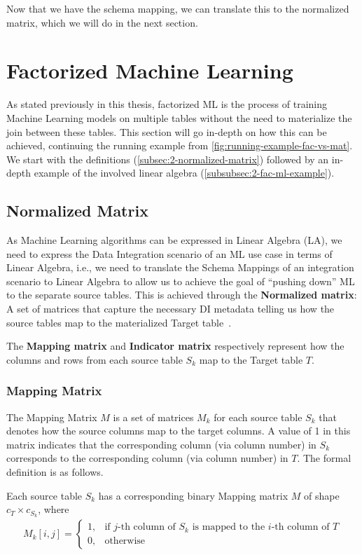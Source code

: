 Now that we have the schema mapping, we can translate this to the normalized matrix, which we will do in the next section.

\section{Factorized Machine Learning}
\label{sec:2-factorized-ml}
As stated previously in this thesis, factorized ML is the process of training Machine Learning models on multiple tables without the need to materialize the join between these tables. This section will go in-depth on how this can be achieved, continuing the running example from \autoref{fig:running-example-fac-vs-mat}.  We start with the definitions (\autoref{subsec:2-normalized-matrix}) followed by an in-depth example of the involved linear algebra (\autoref{subsubsec:2-fac-ml-example}).

\subsection{Normalized Matrix}
\label{subsec:2-normalized-matrix}
As Machine Learning algorithms can be expressed in Linear Algebra (LA), we need to express the Data Integration scenario of an ML use case in terms of Linear Algebra, i.e., we need to translate the Schema Mappings of an integration scenario to Linear Algebra to allow us to achieve the goal of “pushing down” ML to the separate source tables. This is achieved through the \textbf{Normalized matrix}: A set of matrices that capture the necessary DI metadata telling us how the source tables map to the materialized Target table~\cite{amalur, morpheus}.

The \textbf{Mapping matrix} and \textbf{Indicator matrix} respectively represent how the columns and rows from each source table $S_k$ map to the Target table $T$.

\subsubsection{Mapping Matrix}
The Mapping Matrix $M$ is a set of matrices $M_k$ for each source table $S_k$ that denotes how the source columns map to the target columns. A value of 1 in this matrix indicates that the corresponding column (via column number) in $S_k$ corresponds to the corresponding column (via column number) in $T$. The formal definition is as follows.

\begin{definition}
  Each source table $S_k$ has a corresponding binary Mapping matrix $M$ of shape $c_T \times c_{S_k}$, where
  \begin{align*}
    M_k[i,j] = \begin{cases}
                 1, & \text{if $j$-th column of $S_k$ is mapped to the $i$-th column of $T$} \\
                 0, & \text{otherwise}
               \end{cases}
  \end{align*}
\end{definition}

